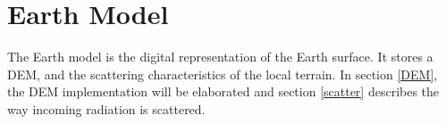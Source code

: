 \section{Earth Model}
\label{earthModel}

The Earth model is the digital representation of the Earth surface. It stores a \ac{DEM}, and the
scattering characteristics of the local terrain. In section \ref{DEM}, the \ac{DEM} implementation
will be elaborated and section \ref{scatter} describes the way incoming radiation is scattered.
